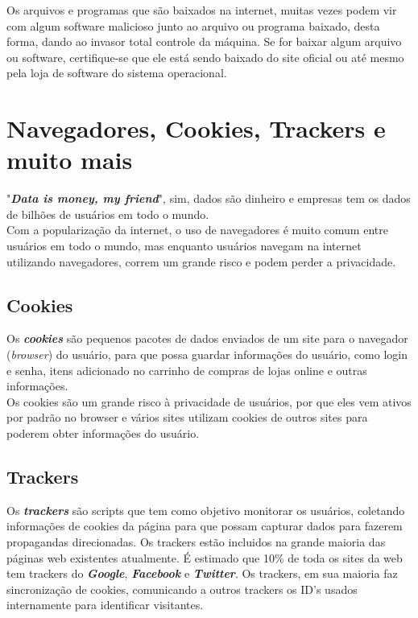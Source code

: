 \documentclass[12pt, letterpaper, Monospace:12]{report}
\begin{document}
	Os arquivos e programas que são baixados na internet, muitas vezes podem vir com algum software malicioso junto ao arquivo ou programa baixado, desta forma, dando ao invasor total controle da máquina. Se for baixar algum arquivo ou software, certifique-se que ele está sendo baixado do site oficial ou até mesmo pela loja de software do sistema operacional.\\

\pagebreak

\section{Navegadores, Cookies, Trackers e muito mais}
	"\textbf{\textit{Data is money, my friend}}", sim, dados são dinheiro e empresas tem os dados de bilhões de usuários em todo o mundo.\\

	Com a popularização da internet, o uso de navegadores é muito comum entre usuários em todo o mundo, mas enquanto usuários navegam na internet utilizando navegadores, correm um grande risco e podem perder a privacidade.\\

\subsection{Cookies}
	Os \textbf{\textit{cookies}} são pequenos pacotes de dados enviados de um site para o navegador (\textit{browser}) do usuário, para que possa guardar informações do usuário, como login e senha, itens adicionado no carrinho de compras de lojas online e outras informações.\\

	Os cookies são um grande risco à privacidade de usuários, por que eles vem ativos por padrão no browser e vários sites utilizam cookies de outros sites para poderem obter informações do usuário.\\

\subsection{Trackers}
	Os \textbf{\textit{trackers}} são scripts que tem como objetivo monitorar os usuários, coletando informações de cookies da página para que possam capturar dados para fazerem propagandas direcionadas. Os trackers estão incluidos na grande maioria das páginas web existentes atualmente. É estimado que 10\% de toda os sites da web tem trackers do \textbf{\textit{Google}}, \textbf{\textit{Facebook}} e \textbf{\textit{Twitter}}. Os trackers, em sua maioria faz sincronização de cookies, comunicando a outros trackers os ID's usados internamente para identificar visitantes.\\
\end{document}
